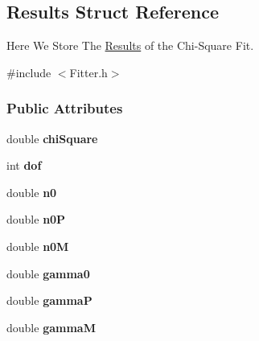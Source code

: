 \hypertarget{structResults}{
\subsection{Results Struct Reference}
\label{structResults}
}


Here We Store The \hyperlink{structResults}{Results} of the Chi-\/Square Fit.  




{\ttfamily \#include $<$Fitter.h$>$}

\subsubsection*{Public Attributes}
\begin{DoxyCompactItemize}
\item 
\hypertarget{structResults_ac58008fea6d5883121699bd03afc9ad0}{
double {\bfseries chiSquare}}
\label{structResults_ac58008fea6d5883121699bd03afc9ad0}

\item 
\hypertarget{structResults_ad63d6c2e0ac07d46d691690612a9f8cb}{
int {\bfseries dof}}
\label{structResults_ad63d6c2e0ac07d46d691690612a9f8cb}

\item 
\hypertarget{structResults_a13110d99aaa161562f4e27e2cfe2df21}{
double {\bfseries n0}}
\label{structResults_a13110d99aaa161562f4e27e2cfe2df21}

\item 
\hypertarget{structResults_aa394673cc90385bb560b72f2f024d35c}{
double {\bfseries n0P}}
\label{structResults_aa394673cc90385bb560b72f2f024d35c}

\item 
\hypertarget{structResults_ad28ddcade55d8d6d9b268fb471f04abf}{
double {\bfseries n0M}}
\label{structResults_ad28ddcade55d8d6d9b268fb471f04abf}

\item 
\hypertarget{structResults_a705449c1fc0884235f0c754ed5cd2819}{
double {\bfseries gamma0}}
\label{structResults_a705449c1fc0884235f0c754ed5cd2819}

\item 
\hypertarget{structResults_a15ce9df52af7605eb16df02aef9aa4f0}{
double {\bfseries gammaP}}
\label{structResults_a15ce9df52af7605eb16df02aef9aa4f0}

\item 
\hypertarget{structResults_a95a3bc14352074c0e92455d497ce2069}{
double {\bfseries gammaM}}
\label{structResults_a95a3bc14352074c0e92455d497ce2069}


\end{DoxyCompactItemize}
